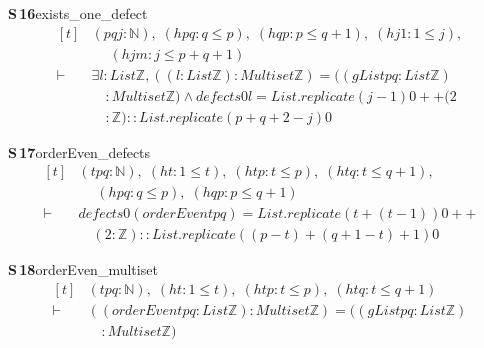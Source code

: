 \documentclass[conference]{IEEEtran}
\theoremstyle{definition}
\newcommand{\lean}[1]{\textsf{\footnotesize #1}}
\begin{document}
\noindent\textbf{S\,16}\quad\lean{exists\_one\_defect}
{\footnotesize\[ \begin{aligned}[t]
&(\mathit{p} \mathit{q} \mathit{j} : \mathbb{N} ),\; (\mathit{hpq} : \mathit{q} \leq \mathit{p}),\; (\mathit{hqp} : \mathit{p} \leq \mathit{q} + 1),\; (\mathit{hj1} : 1 \leq \mathit{j}),\\
&\quad \; (\mathit{hjm} : \mathit{j} \leq \mathit{p} + \mathit{q} + 1)\\
\vdash\;&\exists \mathit{l} : \mathit{List} \mathbb{Z} , ((\mathit{l} : \mathit{List} \mathbb{Z} ) : \mathit{Multiset} \mathbb{Z} ) = ((\mathit{gList} \mathit{p} \mathit{q} : \mathit{List} \mathbb{Z} )\\
&\quad : \mathit{Multiset} \mathbb{Z} ) \wedge \mathit{defects} 0 \mathit{l} = \mathit{List}.\mathit{replicate} (\mathit{j} - 1) 0 ++ (2\\
&\quad : \mathbb{Z} ) :: \mathit{List}.\mathit{replicate} (\mathit{p} + \mathit{q} + 2 - \mathit{j}) 0
\end{aligned} \]}

\noindent\textbf{S\,17}\quad\lean{orderEven\_defects}
{\footnotesize\[ \begin{aligned}[t]
&(\mathit{t} \mathit{p} \mathit{q} : \mathbb{N} ),\; (\mathit{ht} : 1 \leq \mathit{t}),\; (\mathit{htp} : \mathit{t} \leq \mathit{p}),\; (\mathit{htq} : \mathit{t} \leq \mathit{q} + 1),\\
&\quad \; (\mathit{hpq} : \mathit{q} \leq \mathit{p}),\; (\mathit{hqp} : \mathit{p} \leq \mathit{q} + 1)\\
\vdash\;&\mathit{defects} 0 (\mathit{orderEven} \mathit{t} \mathit{p} \mathit{q}) = \mathit{List}.\mathit{replicate} (\mathit{t} + (\mathit{t} - 1)) 0 ++\\
&\quad (2 : \mathbb{Z} ) :: \mathit{List}.\mathit{replicate} ((\mathit{p} - \mathit{t}) + (\mathit{q} + 1 - \mathit{t}) + 1) 0
\end{aligned} \]}

\noindent\textbf{S\,18}\quad\lean{orderEven\_multiset}
{\footnotesize\[ \begin{aligned}[t]
&(\mathit{t} \mathit{p} \mathit{q} : \mathbb{N} ),\; (\mathit{ht} : 1 \leq \mathit{t}),\; (\mathit{htp} : \mathit{t} \leq \mathit{p}),\; (\mathit{htq} : \mathit{t} \leq \mathit{q} + 1)\\
\vdash\;&((\mathit{orderEven} \mathit{t} \mathit{p} \mathit{q} : \mathit{List} \mathbb{Z} ) : \mathit{Multiset} \mathbb{Z} ) = ((\mathit{gList} \mathit{p} \mathit{q} : \mathit{List} \mathbb{Z} )\\
&\quad : \mathit{Multiset} \mathbb{Z} )
\end{aligned} \]}
\end{document}
